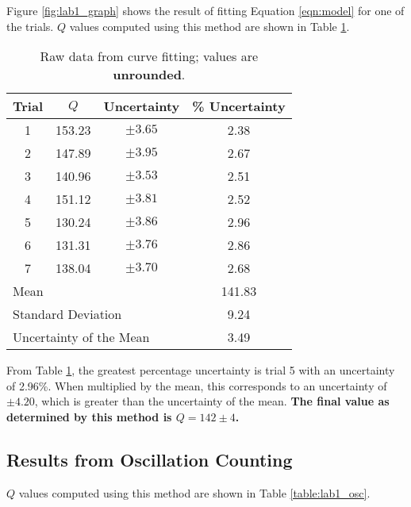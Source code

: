\documentclass[aps,twocolumn,secnumarabic,nobalancelastpage,amsmath,amssymb,nofootinbib,floatfix,letterpaper]{revtex4}
\begin{document}
Figure \ref{fig:lab1_graph} shows the result of fitting Equation \ref{eqn:model} for one of the trials.
\(Q\) values computed using this method are shown in Table \ref{table:lab1_fit}.

\begin{table}[h]
    \begin{tabular}{c|c|c|c}
        Trial & \(Q\) & Uncertainty & \% Uncertainty \\
        \hline
        1   & 153.23    & \(\pm 3.65\) & 2.38 \\
        2   & 147.89    & \(\pm 3.95\) & 2.67 \\
        3	& 140.96	& \(\pm 3.53\) & 2.51 \\
        4	& 151.12	& \(\pm 3.81\) & 2.52 \\
        5	& 130.24	& \(\pm 3.86\) & 2.96 \\
        6	& 131.31	& \(\pm 3.76\) & 2.86 \\
        7	& 138.04	& \(\pm 3.70\) & 2.68 \\
        \hline
        \multicolumn{3}{l}{Mean} & 141.83 \\
        \multicolumn{3}{l}{Standard Deviation} & 9.24 \\
        \multicolumn{3}{l}{Uncertainty of the Mean} & 3.49
    \end{tabular}
    \caption{Raw data from curve fitting; values are \textbf{unrounded}.}
    \label{table:lab1_fit}
\end{table}

From Table \ref{table:lab1_fit}, the greatest percentage uncertainty is trial 5 with an uncertainty of 2.96\%. When
multiplied by the mean, this corresponds to an uncertainty of \(\pm 4.20\), which is greater than the uncertainty of
the mean. \textbf{The final value as determined by this method is \(Q = 142 \pm 4\).}

\subsection{Results from Oscillation Counting}

\(Q\) values computed using this method are shown in Table \ref{table:lab1_osc}.
\end{document}
